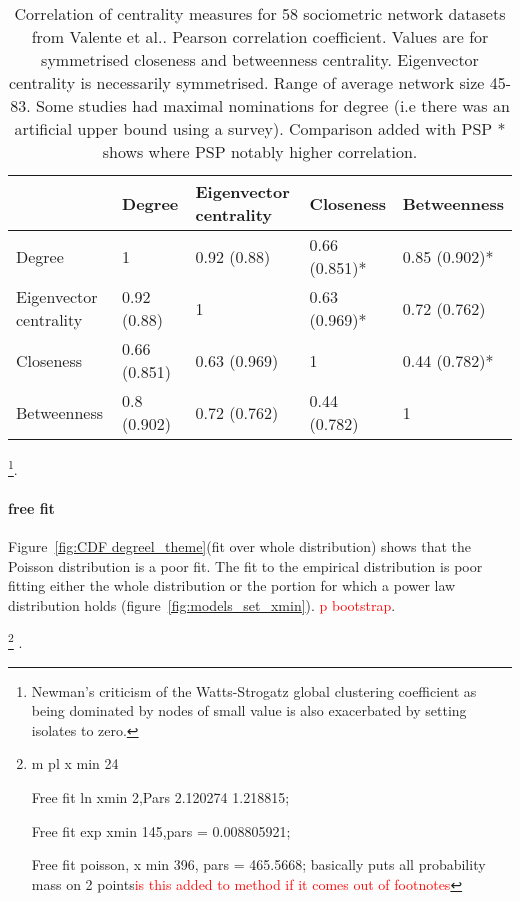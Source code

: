\begin{table}[]
    \centering
    \begin{tabular}{lllll}
    \toprule
          & Degree & Eigenvector centrality & Closeness & Betweenness \\
         \midrule
    Degree  & 1  & 0.92 (0.88)  & 0.66 (0.851)*  & 0.85 (0.902)*\\
    Eigenvector centrality & 0.92 (0.88)  & 1 & 0.63 (0.969)* & 0.72 (0.762)  \\
    Closeness & 0.66 (0.851)  & 0.63 (0.969) & 1 & 0.44 (0.782)* \\
    Betweenness& 0.8 (0.902) & 0.72 (0.762) & 0.44 (0.782) & 1 \\
    \bottomrule
    \end{tabular}
    \caption[Correlation of sociometric centrality measures compared with correlation of measures in PSP]{Correlation of centrality measures for 58 sociometric network datasets from Valente et al.\cite{valente2008correlated}. Pearson correlation coefficient. Values are for symmetrised closeness and betweenness centrality. Eigenvector centrality is necessarily symmetrised. Range of average network size 45-83. Some studies had maximal nominations for degree (i.e there was an artificial upper bound using a survey). Comparison added with PSP * shows where PSP notably higher correlation.}
    \label{tab:Correlation of centrality valente et al compared with PSP}
\end{table}
\footnote{Newman's criticism of the Watts-Strogatz global clustering coefficient as being dominated by nodes of small value is also exacerbated by setting isolates to zero.}.

\paragraph{free fit}



Figure~\ref{fig:CDF degreel_theme}(fit over whole distribution) shows that the Poisson distribution is a poor fit. The fit to the empirical distribution is poor fitting either the whole distribution or the portion for which a power law distribution holds (figure~\ref{fig:models_set_xmin}). \textcolor{red}{p bootstrap}.



\footnote{m pl x min 24
 
 Free fit ln xmin 2,Pars 2.120274 1.218815;
 
 Free fit exp xmin 145,pars = 0.008805921;
 
 Free fit poisson, x min 396, pars = 465.5668;
  basically puts all probability mass on 2 points\textcolor{red}{is this added to method if it comes out of footnotes}}
  .   
  
